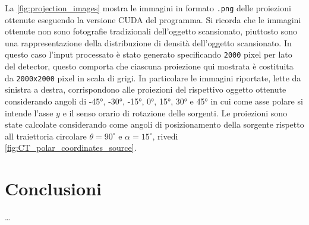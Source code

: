 \documentclass[12pt,a4paper]{report}
\begin{document}
La \autoref{fig:projection_images} mostra le immagini in formato \lstinline{.png} delle proiezioni ottenute eseguendo la versione
CUDA del programma.
Si ricorda che le immagini ottenute non sono fotografie tradizionali dell'oggetto scansionato, piuttosto sono una rappresentazione
della distribuzione di densità dell'oggetto scansionato.
In questo caso l'input processato è stato generato specificando \lstinline{2000} pixel per lato del detector, questo comporta che
ciascuna proiezione qui mostrata è costituita da \lstinline{2000x2000} pixel in scala di grigi.
In particolare le immagini riportate, lette da sinistra a destra, corrispondono alle proiezioni del rispettivo oggetto ottenute
considerando angoli di -45°, -30°, -15°, 0°, 15°, 30° e 45° in cui come asse polare si intende l'asse \(y\) e il senso orario di
rotazione delle sorgenti.
Le proiezioni sono state calcolate considerando come angoli di posizionamento della sorgente rispetto all traiettoria circolare
\(\theta = 90^\circ\) e \(\alpha = 15^\circ\), rivedi \autoref{fig:CT_polar_coordinates_source}.

\appendix

\chapter{Conclusioni}

\dots

\printbibliography
\thispagestyle{empty}
\end{document}
